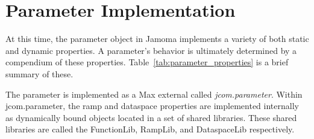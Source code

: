 \documentclass{article}
\begin{document}
\section{Parameter Implementation} %
\label{sec:param_implementation}

At this time, the parameter object in Jamoma implements a variety of both static and dynamic properties. A parameter's behavior is ultimately determined by a compendium of these properties. %
Table~\ref{tab:parameter_properties} is a brief summary of these.

%
%
%
%
%


The parameter is implemented as a Max external called \emph{jcom.parameter}. Within jcom.parameter, the ramp and dataspace properties are implemented internally as dynamically bound objects located in a set of shared libraries.  These shared libraries are called the FunctionLib, RampLib, and DataspaceLib respectively.
\end{document}
